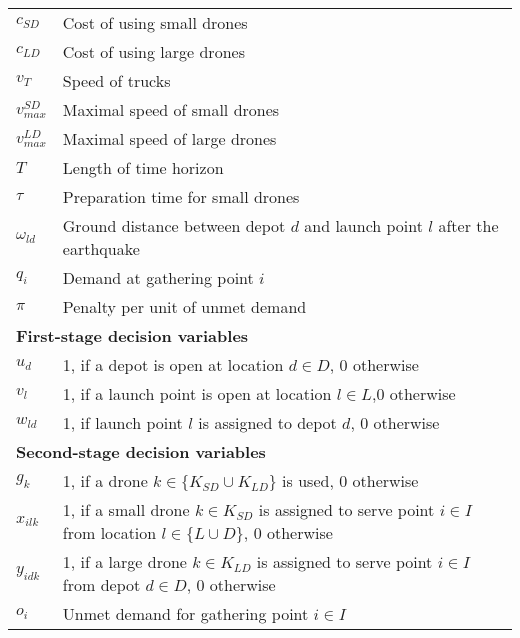 \documentclass[preprint,review,11pt,authoryear]{elsarticle}
\begin{document}
\begin{table}[h!]
{\begin{tabular}{ll}
$c_{SD}$                      & Cost of using small drones                                                                 \\
$c_{LD}$                      & Cost of using large drones                                                                 \\
$v_T$                         & Speed of trucks                                                                            \\
$v_{max}^{SD}$                & Maximal speed of small drones                                                              \\
$v_{max}^{LD}$                & Maximal speed of large drones                                                              \\
$T$                           & Length of time horizon                                                                     \\
$\tau$                        & Preparation time for small drones                                                          \\
$\omega_{ld}$                 & Ground distance between depot $d$ and launch point $l$ after the earthquake                \\
$q_i$                         & Demand at gathering point $i$                                                              \\
$\pi$                         & Penalty per unit of unmet demand                                                           \\
\multicolumn{2}{l}{\textbf{First-stage decision variables}}                                                                \\
$u_d$                         & 1, if a depot is open at location $d \in D$, 0 otherwise                                   \\
$v_l$                         & 1, if a launch point is open at location $l \in L$,0 otherwise                             \\
$w_{ld}$                      & 1, if launch point $l$ is assigned to depot $d$, 0 otherwise                               \\
\multicolumn{2}{l}{\textbf{Second-stage decision variables}}                                                               \\
$g_k$                         & 1, if a drone $k \in \{K_{SD} \cup K_{LD}\}$ is used, 0 otherwise                          \\
$x_{ilk}$                     & 1, if a small drone $k \in K_{SD}$ is assigned to serve point $i \in I$ from location $l \in \{L \cup D\}$, 0 otherwise \\
$y_{idk}$                     & 1, if a large drone $k \in K_{LD}$ is assigned to serve point $i \in I$ from depot $d \in D$, 0 otherwise \\
$o_i$                         & Unmet demand for gathering point $i \in I$                                                 \\
\bottomrule
\end{tabular}
}
\label{table:notation}
\end{table} 
\end{document}
